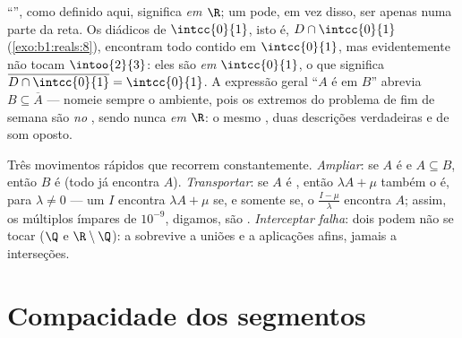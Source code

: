 \begin{example}\label{ex:b1:topology:relativedensity}
``'', como definido aqui, significa  \emph{em $\R$}; um
 pode, em vez disso, ser  apenas numa parte da reta. Os
diádicos de $\intcc{0}{1}$, isto é, $D \cap \intcc{0}{1}$
(\cref{exo:b1:reals:8}), encontram todo   contido em
$\intcc{0}{1}$, mas evidentemente não tocam $\intoo{2}{3}$: eles são
 \emph{em} $\intcc{0}{1}$, o que significa $\overline{D \cap
\intcc{0}{1}} = \intcc{0}{1}$. A expressão geral ``$A$ é 
em $B$'' abrevia $B \subseteq \overline A$ --- nomeie sempre o 
ambiente, pois os extremos do problema de fim de semana são 
\emph{no }, sendo nunca  \emph{em
$\R$}: o mesmo , duas descrições verdadeiras e de som oposto.
\end{example}

\begin{example}\label{ex:b1:topology:densitytricks}
Três movimentos rápidos que recorrem constantemente. \emph{Ampliar}: se
$A$ é  e $A \subseteq B$, então $B$ é  (todo
 já encontra $A$). \emph{Transportar}: se $A$ é
, então $\lambda A + \mu$ também o é, para $\lambda \neq 0$ --- um
 $I$ encontra $\lambda A + \mu$ se, e somente se, o 
$\frac{I - \mu}{\lambda}$ encontra $A$; assim, os múltiplos ímpares de
$10^{-9}$, digamos, são . \emph{Interceptar falha}: dois 
 podem não se tocar ($\Q$ e $\R \setminus \Q$):
a  sobrevive a uniões e a aplicações afins, jamais a
interseções.
\end{example}

\section{Compacidade dos segmentos}


